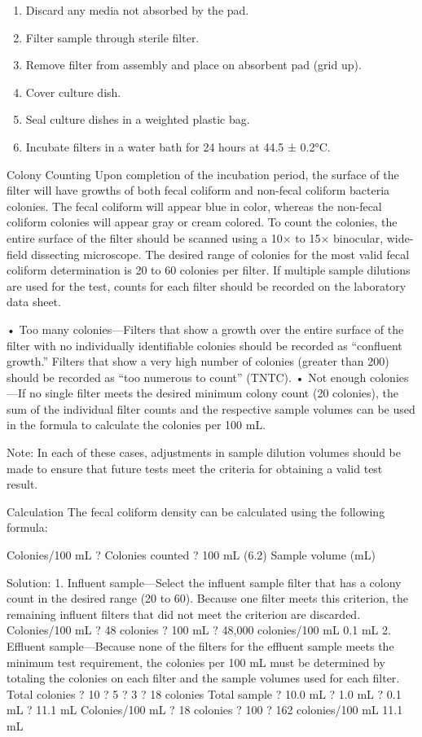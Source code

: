 \documentclass{article}
\begin{document}
\begin{enumerate}
\def\labelenumi{\alph{enumi}.}
\setcounter{enumi}{2}
\tightlist
\item
  Discard any media not absorbed by the pad.
\item
  Filter sample through sterile filter.
\item
  Remove filter from assembly and place on absorbent pad (grid up).
\item
  Cover culture dish.
\item
  Seal culture dishes in a weighted plastic bag.
\item
  Incubate filters in a water bath for 24 hours at 44.5 ± 0.2°C.
\end{enumerate}

Colony Counting Upon completion of the incubation period, the surface of
the filter will have growths of both fecal coliform and non-fecal
coliform bacteria colonies. The fecal coliform will appear blue in
color, whereas the non-fecal coliform colonies will appear gray or cream
colored. To count the colonies, the entire surface of the filter should
be scanned using a 10× to 15× binocular, wide-field dissecting
microscope. The desired range of colonies for the most valid fecal
coliform determination is 20 to 60 colonies per filter. If multiple
sample dilutions are used for the test, counts for each filter should be
recorded on the laboratory data sheet.

• Too many colonies---Filters that show a growth over the entire surface
of the filter with no individually identifiable colonies should be
recorded as ``confluent growth.'' Filters that show a very high number
of colonies (greater than 200) should be recorded as ``too numerous to
count'' (TNTC). • Not enough colonies---If no single filter meets the
desired minimum colony count (20 colonies), the sum of the individual
filter counts and the respective sample volumes can be used in the
formula to calculate the colonies per 100 mL.

Note: In each of these cases, adjustments in sample dilution volumes
should be made to ensure that future tests meet the criteria for
obtaining a valid test result.

Calculation The fecal coliform density can be calculated using the
following formula:

Colonies/100 mL ? Colonies counted ? 100 mL (6.2) Sample volume (mL)

Solution: 1. Influent sample---Select the influent sample filter that
has a colony count in the desired range (20 to 60). Because one filter
meets this criterion, the remaining influent filters that did not meet
the criterion are discarded. Colonies/100 mL ? 48 colonies ? 100 mL ?
48,000 colonies/100 mL 0.1 mL 2. Effluent sample---Because none of the
filters for the effluent sample meets the minimum test requirement, the
colonies per 100 mL must be determined by totaling the colonies on each
filter and the sample volumes used for each filter. Total colonies ? 10
? 5 ? 3 ? 18 colonies Total sample ? 10.0 mL ? 1.0 mL ? 0.1 mL ? 11.1 mL
Colonies/100 mL ? 18 colonies ? 100 ? 162 colonies/100 mL 11.1 mL
\end{document}
